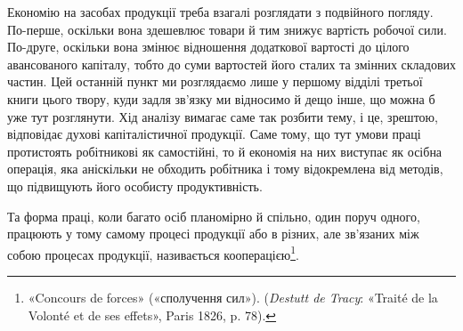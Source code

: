 Економію на засобах продукції треба взагалі розглядати з
подвійного погляду. По-перше, оскільки вона здешевлює товари
й тим знижує вартість робочої сили. По-друге, оскільки вона змінює
відношення додаткової вартості до цілого авансованого капіталу,
тобто до суми вартостей його сталих та змінних складових
частин. Цей останній пункт ми розглядаємо лише у першому
відділі третьої книги цього твору, куди задля зв’язку ми відносимо
й дещо інше, що можна б уже тут розглянути. Хід аналізу
вимагає саме так розбити тему, і це, зрештою, відповідає духові
капіталістичної продукції. Саме тому, що тут умови праці протистоять
робітникові як самостійні, то й економія на них виступає
як осібна операція, яка аніскільки не обходить робітника і
тому відокремлена від методів, що підвищують його особисту продуктивність.

Та форма праці, коли багато осіб планомірно й спільно, один
поруч одного, працюють у тому самому процесі продукції або в різних,
але зв’язаних між собою процесах продукції, називається
кооперацією\footnote{
«Concours de forces» («сполучення сил»). (\emph{Destutt de Tracy}: «Traité
de la Volonté et de ses effets», Paris 1826, p. 78).
}.

